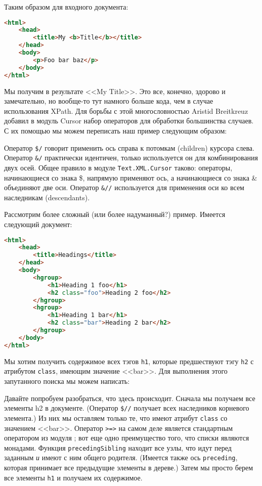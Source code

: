 Таким образом для входного документа:

\begin{lstlisting}[language=HTML]
<html>
    <head>
        <title>My <b>Title</b></title>
    </head>
    <body>
        <p>Foo bar baz</p>
    </body>
</html>
\end{lstlisting}

Мы получим в результате <<My Title>>. Это все, конечно, здорово и замечательно, но вообще-то тут намного больше кода, чем в случае использования XPath. Для борьбы с этой многословностью Aristid Breitkreuz добавил в модуль Cursor набор операторов для обработки большинства случаев. С их помощью мы можем переписать наш пример следующим образом:


Оператор \lstinline!$/! говорит применить ось справа к потомкам (children) курсора слева. Оператор \lstinline!&/! практически идентичен, только используется он для комбинирования двух осей. Общее правило в модуле \lstinline!Text.XML.Cursor! таково: операторы, начинающиеся со знака \$, напрямую применяют ось, а начинающиеся со знака \& объединяют две оси. Оператор \lstinline!&//! используется для применения оси ко всем наследникам (descendants).

Рассмотрим более сложный (или более надуманный?) пример. Имеется следующий документ:

\begin{lstlisting}[language=HTML]
<html>
    <head>
        <title>Headings</title>
    </head>
    <body>
        <hgroup>
            <h1>Heading 1 foo</h1>
            <h2 class="foo">Heading 2 foo</h2>
        </hgroup>
        <hgroup>
            <h1>Heading 1 bar</h1>
            <h2 class="bar">Heading 2 bar</h2>
        </hgroup>
    </body>
</html>
\end{lstlisting}

Мы хотим получить содержимое всех тэгов \lstinline!h1!, которые предшествуют тэгу \lstinline!h2! с атрибутом \lstinline!class!, имеющим значение <<bar>>. Для выполнения этого запутанного поиска мы можем написать:


Давайте попробуем разобраться, что здесь происходит. Сначала мы получаем все элементы h2 в документе. (Оператор \lstinline!$//! получает всех наследников корневого элемента.) Из них мы оставляем только те, что имеют атрибут \lstinline!class! со значением <<bar>>. Оператор \lstinline!>=>! на самом деле является стандартным оператором из модуля ; вот еще одно преимущество того, что списки являются монадами. Функция \lstinline!precedingSibling! находит все узлы, что идут перед заданным \emph{и} имеют с ним общего родителя. (Имеется также ось \lstinline!preceding!, которая принимает все предыдущие элементы в дереве.) Затем мы просто берем все элементы \lstinline!h1! и получаем их содержимое.

